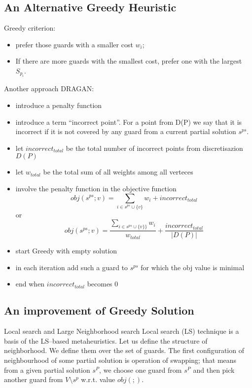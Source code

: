 \documentclass[runningheads,a4paper]{llncs}
\begin{document}
        \subsection{An Alternative Greedy Heuristic}
         Greedy criterion:
          \begin{itemize}
          	\item prefer those guards with a smaller cost $w_i$;
          	\item If there are more guards with the smallest cost,
          	prefer one with the largest $S_{p_i}$.
          \end{itemize}
		 Another approach DRAGAN:
           \begin{itemize}
			\item introduce a penalty function
          	\item introduce a term ``incorrect point''. For a point from D(P) we say that it is incorrect if it is not covered by any guard from a current partial solution $s^{ps}$.
			\item let $incorrect_{total}$ be the total number of incorrect points from discretisazion $D(P)$
			\item let $w_{total}$ be the total sum of all weights among all verteces
			\item involve the penalty function in the objective function
				$$obj(s^{ps}; v)  = \sum_{i \in s^{ps} \cup \{v\}} w_i+ incorrect_{total}$$ or
				$$obj(s^{ps}; v) = \frac{\sum_{i \in s^{ps} \cup \{v\}\}} w_i}{w_{total}}+ \frac{incorrect_{total}}{|D(P)|}$$
			\item start Greedy with empty solution
			\item in each iteration add such a guard to $s^{ps}$ for which the obj value is minimal
			\item end when $incorrect_{total}$ becomes 0
          \end{itemize}
      \subsection{An improvement of Greedy Solution}
      Local search and Large Neighborhood search 
      Local search (LS) technique is a basis of the LS--based metaheuristics. Let us define the structure of neighborhood. We define them over the set of guards.
      The first configuration of neighbourhood of some partial solution is operation of swapping; that means from a given partial solution $s^P$, we choose one guard from $s^P$ and then pick another guard from $V \setminus s^p$ w.r.t. value $obj(;)$.
\end{document}
